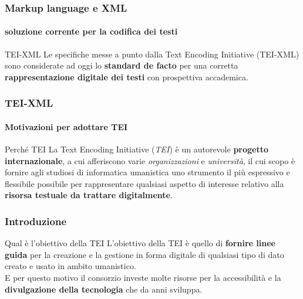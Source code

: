 \begin{frame}
	\frametitle{Markup language e XML}
	\framesubtitle{soluzione corrente per la codifica dei testi}
	\addtocounter{nframe}{1}

	\begin{block}{TEI-XML}
		Le specifiche messe a punto dalla Text Encoding Initiative (TEI-XML) sono considerate ad oggi lo \textbf{standard de facto} per una corretta \textbf{rappresentazione digitale dei testi} con prospettiva accademica.
	\end{block}

\end{frame}

\begin{frame}
	\frametitle{TEI-XML}
	\framesubtitle{Motivazioni per adottare TEI}
	\addtocounter{nframe}{1}

	\begin{block}{Perché TEI}
		La Text Encoding Initiative (\textit{TEI}) è un autorevole \textbf{progetto internazionale}, a cui afferiscono varie \textit{organizzazioni} e \textit{università}, il cui scopo è fornire agli studiosi di informatica umanistica uno strumento il più espressivo e flessibile possibile per rappresentare qualsiasi aspetto di interesse relativo alla \textbf{risorsa testuale da trattare digitalmente}.
	\end{block}

\end{frame}

\begin{frame}
	\frametitle{Introduzione}
	\addtocounter{nframe}{1}
    
    \begin{block}{Qual è l'obiettivo della TEI}
        L'obiettivo della TEI è quello di \textbf{fornire linee guida} per la creazione e la gestione in forma digitale di qualsiasi tipo di dato creato e usato in ambito umanistico.
        \\ E per questo motivo il consorzio investe molte risorse per la accessibilità e la \textbf{divulgazione della tecnologia} che da anni sviluppa.
    \end{block}
    
\end{frame}

